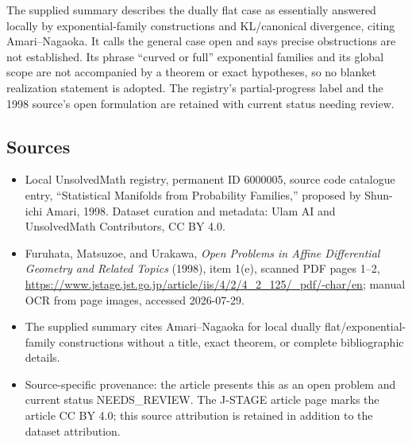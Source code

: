 \documentclass[11pt]{article}
\begin{document}
The supplied summary describes the dually flat case as essentially answered locally by exponential-family constructions and KL/canonical divergence, citing Amari--Nagaoka. It calls the general case open and says precise obstructions are not established. Its phrase ``curved or full'' exponential families and its global scope are not accompanied by a theorem or exact hypotheses, so no blanket realization statement is adopted. The registry's partial-progress label and the 1998 source's open formulation are retained with current status needing review.
\subsection{Sources}
\begin{itemize}
\item Local UnsolvedMath registry, permanent ID 6000005, source code catalogue entry, ``Statistical Manifolds from Probability Families,'' proposed by Shun-ichi Amari, 1998. Dataset curation and metadata: Ulam AI and UnsolvedMath Contributors, CC BY 4.0.
\item Furuhata, Matsuzoe, and Urakawa, \emph{Open Problems in Affine Differential Geometry and Related Topics} (1998), item 1(e), scanned PDF pages 1--2, \url{https://www.jstage.jst.go.jp/article/iis/4/2/4_2_125/_pdf/-char/en}; manual OCR from page images, accessed 2026-07-29.
\item The supplied summary cites Amari--Nagaoka for local dually flat/exponential-family constructions without a title, exact theorem, or complete bibliographic details.
\item Source-specific provenance: the article presents this as an open problem and current status NEEDS\_REVIEW. The J-STAGE article page marks the article CC BY 4.0; this source attribution is retained in addition to the dataset attribution.
\end{itemize}
\end{document}
